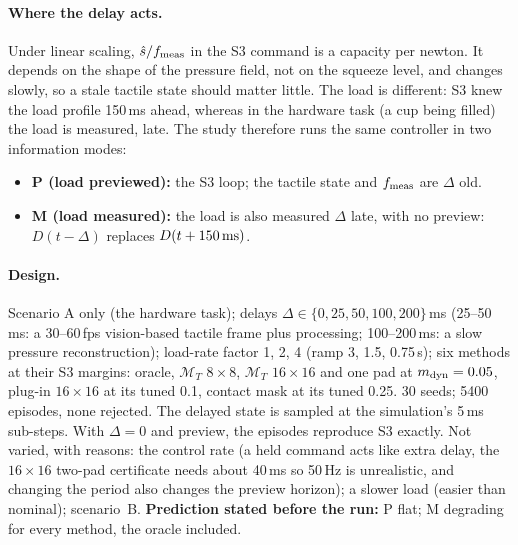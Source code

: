 \documentclass[11pt,a4paper]{article}
\newcommand{\M}{\mathcal M}
\begin{document}
\paragraph{Where the delay acts.} Under linear scaling, $\hat s/f_{\rm meas}$ in the S3 command is a capacity per newton. It depends on the shape of the
pressure field, not on the squeeze level, and changes slowly, so a stale tactile state should matter little. The load is different: S3 knew
the load profile 150\,ms ahead, whereas in the hardware task (a cup being filled) the load is measured, late. The study therefore runs the same
controller in two information modes:
\begin{itemize}
    \item \textbf{P (load previewed):} the S3 loop; the tactile state and $f_{\rm meas}$ are $\Delta$ old.
    \item \textbf{M (load measured):} the load is also measured $\Delta$ late, with no preview: $D(t-\Delta)$ replaces $D(t+150\,{\rm ms})$.
\end{itemize}

\paragraph{Design.} Scenario A only (the hardware task); delays $\Delta\in\{0,25,50,100,200\}$\,ms (25--50\,ms: a 30--60\,fps vision-based tactile frame
plus processing; 100--200\,ms: a slow pressure reconstruction); load-rate factor 1, 2, 4 (ramp 3, 1.5, 0.75\,s); six methods at their S3 margins:
oracle, $\M_T$ $8\times8$, $\M_T$ $16\times16$ and one pad at $m_{\rm dyn}=0.05$, plug-in $16\times16$ at its tuned 0.1, contact mask at its tuned 0.25.
30 seeds; 5400 episodes, none rejected. The delayed state is sampled at the simulation's 5\,ms sub-steps. With $\Delta=0$ and preview, the episodes
reproduce S3 exactly. Not varied, with reasons: the control rate (a held command acts like extra delay, the $16\times16$ two-pad certificate needs
about 40\,ms so 50\,Hz is unrealistic, and changing the period also changes the preview horizon); a slower load (easier than nominal); scenario~B.
\textbf{Prediction stated before the run:} P flat; M degrading for every method, the oracle included.
\end{document}
